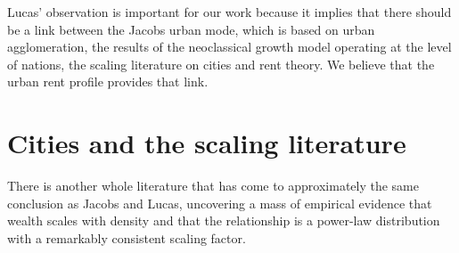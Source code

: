 Lucas' observation is important for our work because it implies that there should be a link between the Jacobs urban mode, which is based on urban agglomeration,  the results of the neoclassical growth model operating at the level of nations, the scaling literature on cities and rent theory. 
We believe that the urban rent profile provides that link. %






\section{Cities and the scaling literature}


There is another whole literature that has come to approximately the same conclusion as Jacobs and Lucas, %
uncovering a mass of empirical evidence that wealth scales with density and that the relationship is a power-law distribution with a remarkably consistent scaling factor. 
 

